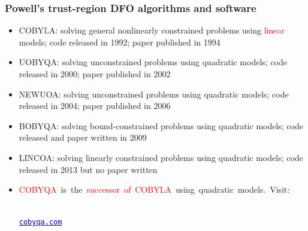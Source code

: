 \documentclass[slidestop,mathserif,xcolor=dvipsnames]{beamer}
\newcommand{\blue}[1]{\textcolor{blue}{#1}}
\newcommand{\red}[1]{\textcolor{red}{#1}}
\begin{document}
\begin{frame}
  \frametitle{Powell's trust-region DFO algorithms and software}

      \begin{itemize}
          \item  COBY\red{L}A: solving general nonlinearly constrained problems using \red{linear} models; code released in 1992; paper published in 1994
      \vspace{0.5ex}

    \item  UOBYQA: solving unconstrained problems using quadratic models; code released in 2000; paper published in 2002
      \vspace{0.5ex}

    \item  NEWUOA: solving unconstrained problems using quadratic models; code released in 2004; paper published in 2006
      \vspace{0.5ex}

    \item  BOBYQA:
       solving bound-constrained problems using
       quadratic models; code released and paper written in 2009

      \vspace{0.5ex}
     \item  LINCOA:
       solving linearly constrained problems using
       quadratic models; code released in 2013 but no paper written

       \vspace{0.5ex}
   \item[\blue{\HandRight}]
       \small{
           \mbox{\red{COBYQA} is the \red{successor of COBYLA} using quadratic models. Visit:}
           \\[0.8ex]
    \begin{center}
    \\[0.8ex]\href{http://www.cobyqa.com}{\blue{\texttt{cobyqa.com}}}
    \end{center}
}
  \end{itemize}
\end{frame}

\end{document}
